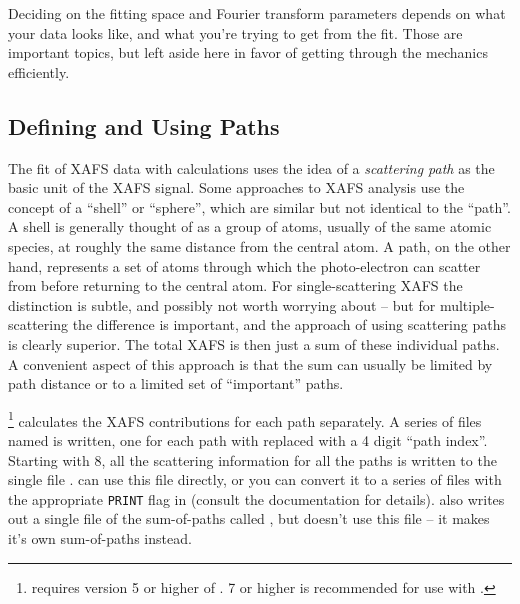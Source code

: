 Deciding on the fitting space and Fourier transform parameters depends on
what your data looks like, and what you're trying to get from the fit.
Those are important topics, but left aside here in favor of getting through
the mechanics efficiently.

\subsection{Defining and Using Paths} \label{Ch:FEFFIT-paths}

The fit of XAFS data with {\feff} calculations uses the idea of a
{\emph{scattering path}} as the basic unit of the XAFS signal.  Some
approaches to XAFS analysis use the concept of a ``shell'' or ``sphere'',
which are similar but not identical to the ``path''.  A shell is generally
thought of as a group of atoms, usually of the same atomic species, at
roughly the same distance from the central atom.  A path, on the other
hand, represents a set of atoms through which the photo-electron can
scatter from before returning to the central atom.  For single-scattering
XAFS the distinction is subtle, and possibly not worth worrying about --
but for multiple-scattering the difference is important, and the approach
of using scattering paths is clearly superior.  The total XAFS is then just
a sum of these individual paths.  A convenient aspect of this approach is
that the sum can usually be limited by path distance or to a limited set of
``important'' paths.
{}
{}

{\feff} {\footnote{{\ifeffit} requires version 5 or higher of {\feff}.
    {\feff}7 or higher is recommended for use with {\ifeffit}.}}
calculates the XAFS contributions for each path separately.  A series of
files named {\feffndat} is written, one for each path with {}
replaced with a 4 digit ``path index''.  Starting with {\feff}8, all the
scattering information for all the paths is written to the single file
{}.  {\ifeffit} can use this file directly, or you can
convert it to a series of {\feffndat} files with the appropriate
{\tt{PRINT}} flag in {\feff} (consult the {\feff} documentation for
details). {\feff} also writes out a single file of the sum-of-paths called
{}, but {\ifeffit} doesn't use this file -- it makes it's own
sum-of-paths instead.  { 
}

